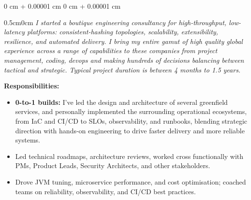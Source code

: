 \documentclass[10pt, letterpaper]{article}
\newenvironment{onecolentry}{
    \begin{adjustwidth}{
        0 cm + 0.00001 cm
    }{
        0 cm + 0.00001 cm
    }
}{
    \end{adjustwidth}
} %
\begin{document}
        \vspace{0.10 cm}
        \begin{onecolentry}
            \begin{adjustwidth}{0.5cm}{0cm}
            \textit{I started a boutique engineering consultancy for high-throughput, low-latency platforms: consistent-hashing topologies, scalability, extensibility, resilience, and automated delivery. I bring my entire gamut of high quality global experience across a range of capabilities to these companies from project management, coding, devops and making hundreds of decisions balancing between tactical and strategic. Typical project duration is between 4 months to 1.5 years.}
            \end{adjustwidth}
            
            \vspace{0.10 cm}
            \hspace{0.5cm}\textbf{Responsibilities:}
            \begin{itemize}[
                topsep=0.10 cm,
                parsep=0.10 cm,
                partopsep=0pt,
                itemsep=0pt,
                leftmargin=0 cm + 10pt + 0.5cm
            ]
                \item \textbf{0-to-1 builds:} I’ve led the design and architecture of several greenfield services, and personally implemented the surrounding operational ecosystems, from IaC and CI/CD to SLOs, observability, and runbooks, blending strategic direction with hands-on engineering to drive faster delivery and more reliable systems.
                \item Led technical roadmaps, architecture reviews, worked cross functionally with PMs, Product Leads, Security Architects, and other stakeholders.
                \item Drove JVM tuning, microservice performance, and cost optimisation; coached teams on reliability, observability, and CI/CD best practices.
            \end{itemize}
            

\end{onecolentry}
\end{document}
